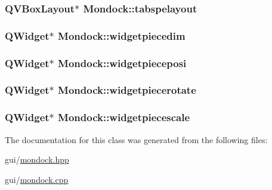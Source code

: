 \hypertarget{class_mondock_af59762fb339ae8c0821fada75433e8fb}{
\subsubsection[{tabspelayout}]{\setlength{\rightskip}{0pt plus 5cm}Q\+V\+Box\+Layout$\ast$ Mondock\+::tabspelayout\hspace{0.3cm}{\ttfamily [private]}}}\label{class_mondock_af59762fb339ae8c0821fada75433e8fb}
\hypertarget{class_mondock_abe21ad30be63590c6ce6e18969e9f082}{
\subsubsection[{widgetpiecedim}]{\setlength{\rightskip}{0pt plus 5cm}Q\+Widget$\ast$ Mondock\+::widgetpiecedim\hspace{0.3cm}{\ttfamily [private]}}}\label{class_mondock_abe21ad30be63590c6ce6e18969e9f082}
\hypertarget{class_mondock_a960802e2aa94a22487ff03bbaa102a02}{
\subsubsection[{widgetpieceposi}]{\setlength{\rightskip}{0pt plus 5cm}Q\+Widget$\ast$ Mondock\+::widgetpieceposi\hspace{0.3cm}{\ttfamily [private]}}}\label{class_mondock_a960802e2aa94a22487ff03bbaa102a02}
\hypertarget{class_mondock_af63f72dedf5afeaf073592a02800c5bd}{
\subsubsection[{widgetpiecerotate}]{\setlength{\rightskip}{0pt plus 5cm}Q\+Widget$\ast$ Mondock\+::widgetpiecerotate\hspace{0.3cm}{\ttfamily [private]}}}\label{class_mondock_af63f72dedf5afeaf073592a02800c5bd}
\hypertarget{class_mondock_ac94f8cc2fda714079ee5a9ae363fe052}{
\subsubsection[{widgetpiecescale}]{\setlength{\rightskip}{0pt plus 5cm}Q\+Widget$\ast$ Mondock\+::widgetpiecescale\hspace{0.3cm}{\ttfamily [private]}}}\label{class_mondock_ac94f8cc2fda714079ee5a9ae363fe052}


The documentation for this class was generated from the following files\+:\begin{DoxyCompactItemize}
\item 
gui/\hyperlink{mondock_8hpp}{mondock.\+hpp}\item 
gui/\hyperlink{mondock_8cpp}{mondock.\+cpp}\end{DoxyCompactItemize}
